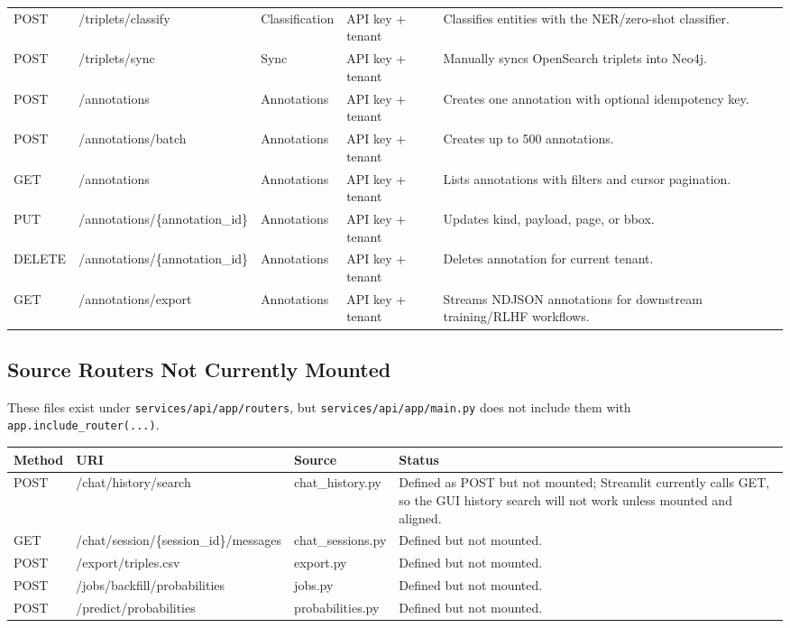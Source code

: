 \documentclass[10pt,letterpaper]{article}
\begin{document}
\begin{scriptsize}
\begin{longtable}{>{\raggedright\arraybackslash}p{1.34in}>{\raggedright\arraybackslash}p{1.34in}>{\raggedright\arraybackslash}p{1.34in}>{\raggedright\arraybackslash}p{1.34in}>{\raggedright\arraybackslash}p{1.34in}}
POST & /triplets/classify & Classification & API key + tenant & Classifies entities with the NER/zero-shot classifier. \\
POST & /triplets/sync & Sync & API key + tenant & Manually syncs OpenSearch triplets into Neo4j. \\
POST & /annotations & Annotations & API key + tenant & Creates one annotation with optional idempotency key. \\
POST & /annotations/batch & Annotations & API key + tenant & Creates up to 500 annotations. \\
GET & /annotations & Annotations & API key + tenant & Lists annotations with filters and cursor pagination. \\
PUT & /annotations/\{annotation\_id\} & Annotations & API key + tenant & Updates kind, payload, page, or bbox. \\
DELETE & /annotations/\{annotation\_id\} & Annotations & API key + tenant & Deletes annotation for current tenant. \\
GET & /annotations/export & Annotations & API key + tenant & Streams NDJSON annotations for downstream training/RLHF workflows. \\
\end{longtable}
\end{scriptsize}

\subsection{Source Routers Not Currently Mounted}

These files exist under \texttt{services/api/app/routers}, but \texttt{services/api/app/main.py} does not include them with \texttt{app.include\_router(...)}.

\begin{scriptsize}
\begin{longtable}{>{\raggedright\arraybackslash}p{1.68in}>{\raggedright\arraybackslash}p{1.68in}>{\raggedright\arraybackslash}p{1.68in}>{\raggedright\arraybackslash}p{1.68in}}
Method & URI & Source & Status \\
\hline
POST & /chat/history/search & chat\_history.py & Defined as POST but not mounted; Streamlit currently calls GET, so the GUI history search will not work unless mounted and aligned. \\
GET & /chat/session/\{session\_id\}/messages & chat\_sessions.py & Defined but not mounted. \\
POST & /export/triples.csv & export.py & Defined but not mounted. \\
POST & /jobs/backfill/probabilities & jobs.py & Defined but not mounted. \\
POST & /predict/probabilities & probabilities.py & Defined but not mounted. \\
\end{longtable}
\end{scriptsize}
\end{document}
